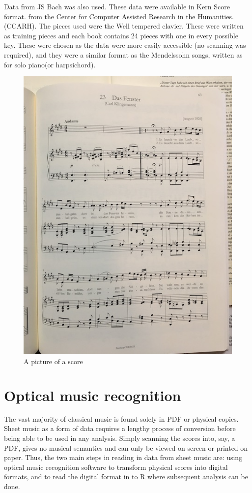 \documentclass[12pt,twoside]{reedthesis}
\theoremstyle{definition}
\theoremstyle{definition}
\theoremstyle{definition}
\theoremstyle{remark}
\begin{document}
Data from JS Bach was also used. These data were available in Kern Score
format. from the Center for Computer Assisted Research in the
Humanities. (CCARH). The pieces used were the Well tempered clavier.
These were written as training pieces and each book contains 24 pieces
with one in every possible key. These were chosen as the data were more
easily accessible (no scanning was required), and they were a similar
format as the Mendelssohn songs, written as for solo piano(or
harpsichord).
\begin{figure}
\centering
\includegraphics{images/scorephoto.JPG}
\caption{\label{fig:unnamed-chunk-1}A picture of a score}
\end{figure}
\section{Optical music recognition}\label{optical-music-recognition}

The vast majority of classical music is found solely in PDF or physical
copies. Sheet music as a form of data requires a lengthy process of
conversion before being able to be used in any analysis. Simply scanning
the scores into, say, a PDF, gives no musical semantics and can only be
viewed on screen or printed on paper. Thus, the two main steps in
reading in data from sheet music are: using optical music recognition
software to transform physical scores into digital formats, and to read
the digital format in to R where subsequent analysis can be done.
\end{document}
